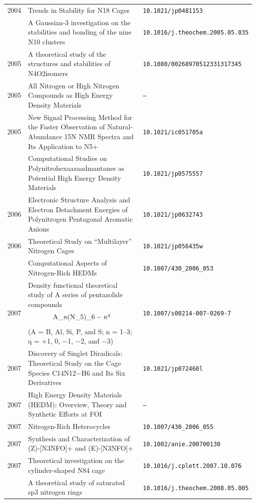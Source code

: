 \begin{longtable}{@{}p{1.0cm}p{10.5cm}p{3.5cm}@{}}
2004 & Trends in Stability for N18 Cages & \small\texttt{10.1021/jp0481153} \\
\addlinespace
2005 & A Gaussian-3 investigation on the stabilities and bonding of the nine N10 clusters & \small\texttt{10.1016/j.theochem.2005.05.035} \\
2005 & A theoretical study of the structures and stabilities of N4O2isomers & \small\texttt{10.1080/00268970512331317345} \\
2005 & All Nitrogen or High Nitrogen Compounds as High Energy Density Materials & \small\texttt{--} \\
2005 & New Signal Processing Method for the Faster Observation of Natural-Abundance 15N NMR Spectra and Its Application to N5+ & \small\texttt{10.1021/ic051705a} \\
\addlinespace
2006 & Computational Studies on Polynitrohexaazaadmantanes as Potential High Energy Density Materials & \small\texttt{10.1021/jp0575557} \\
2006 & Electronic Structure Analysis and Electron Detachment Energies of Polynitrogen Pentagonal Aromatic Anions & \small\texttt{10.1021/jp0632743} \\
2006 & Theoretical Study on “Multilayer” Nitrogen Cages & \small\texttt{10.1021/jp056435w} \\
\addlinespace
2007 & Computational Aspects of Nitrogen-Rich HEDMs & \small\texttt{10.1007/430\_2006\_053} \\
2007 & Density functional theoretical study of A series of pentazolide compounds $$\hbox{A}\_{\it n}(\hbox{N}\_5)\_{\rm 6-{\it n}}^{\it q}$$ (A = B, Al, Si, P, and S; n = 1–3; q = +1, 0, −1, −2, and −3) & \small\texttt{10.1007/s00214-007-0269-7} \\
2007 & Discovery of Singlet Diradicals: Theoretical Study on the Cage Species C14N12−H6 and Its Six Derivatives & \small\texttt{10.1021/jp072460l} \\
2007 & High Energy Density Materials (HEDM): Overview, Theory and Synthetic Efforts at FOI & \small\texttt{--} \\
2007 & Nitrogen-Rich Heterocycles & \small\texttt{10.1007/430\_2006\_055} \\
2007 & Synthesis and Characterization of (Z)‐[N3NFO]+ and (E)‐[N3NFO]+ & \small\texttt{10.1002/anie.200700130} \\
2007 & Theoretical investigation on the cylinder-shaped N84 cage & \small\texttt{10.1016/j.cplett.2007.10.076} \\
\addlinespace
2008 & A theoretical study of saturated sp3 nitrogen rings & \small\texttt{10.1016/j.theochem.2008.05.005} \\

\end{longtable}
